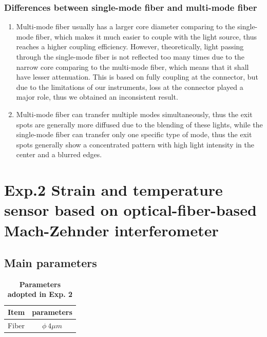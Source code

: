 \documentclass[12pt,a4paper,UTF8]{article}
\begin{document}
        \subsubsection{Differences between single-mode fiber and multi-mode fiber}
        \begin{enumerate}[label=\arabic*.]
            \item Multi-mode fiber usually has a larger core diameter comparing to the single-mode fiber, which makes it much easier to couple with the light source, thus reaches a higher coupling efficiency.
                  However, theoretically, light passing through the single-mode fiber is not reflected too many times due to the narrow core comparing to the multi-mode fiber, 
                  which means that it shall have lesser attenuation. 
                  This is based on fully coupling at the connector, but due to the limitations of our instruments, loss at the connector played a major role, thus we obtained an inconsistent result.
            \item Multi-mode fiber can transfer multiple modes simultaneously, thus the exit spots are generally more diffused due to the blending of these lights, 
                  while the single-mode fiber can transfer only one specific type of mode, thus the exit spots generally show a concentrated pattern with high light intensity in the center and a blurred edges.
        \end{enumerate}

\newpage
\section{Exp.2 Strain and temperature sensor based on optical-fiber-based Mach-Zehnder interferometer}
    \subsection{Main parameters}
    \begin{table}[htbp]
        \centering
            \begin{tabular}{cc}
                \toprule
                Item &parameters  \\
                \midrule
                Fiber &$\phi \ 4 \mu m$ \\
                \bottomrule
            \end{tabular}
            \caption{\textbf{Parameters adopted in Exp. 2}}
            \label{tab.2.0}
    \end{table}	
\end{document}
